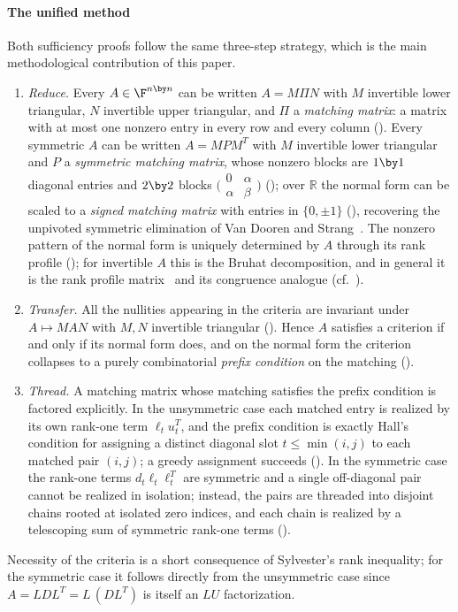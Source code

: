 \paragraph{The unified method}
Both sufficiency proofs follow the same three-step strategy, which is the
main methodological contribution of this paper.
\begin{enumerate}
  \item \emph{Reduce.}  Every $A \in \F^{n \by n}$ can be written
    $A = M \Pi N$ with $M$ invertible lower triangular, $N$ invertible upper
    triangular, and $\Pi$ a \emph{matching matrix}: a matrix with at most one
    nonzero entry in every row and every column
    ().  Every symmetric $A$ can be written
    $A = M P M^T$ with $M$ invertible lower triangular and $P$ a
    \emph{symmetric matching matrix}, whose nonzero blocks are $1 \by 1$
    diagonal entries and $2 \by 2$ blocks
    $\bigl(\begin{smallmatrix} 0 & \alpha\\ \alpha & \beta
    \end{smallmatrix}\bigr)$ (); over $\mathbb{R}$
    the normal form can be scaled to a \emph{signed matching matrix} with
    entries in $\{0, \pm 1\}$ (), recovering the
    unpivoted symmetric elimination of Van Dooren and
    Strang~\cite{vandooren_strang_2014}.  The nonzero pattern of the
    normal form is uniquely determined by $A$ through its rank profile
    (); for invertible $A$ this is the Bruhat
    decomposition, and in general it is the rank profile
    matrix~\cite{dumas_pernet_sultan_2017} and its congruence analogue
    (cf.~\cite{szechtman_2007}).
  \item \emph{Transfer.}  All the nullities appearing in the criteria are
    invariant under $A \mapsto MAN$ with $M, N$ invertible triangular
    ().  Hence $A$ satisfies a criterion if and only if
    its normal form does, and on the normal form the criterion collapses to
    a purely combinatorial \emph{prefix condition} on the matching
    ().
  \item \emph{Thread.}  A matching matrix whose matching satisfies the
    prefix condition is factored explicitly.  In the unsymmetric case each
    matched entry is realized by its own rank-one term
    $\ell_t u_t^T$, and the prefix condition is exactly Hall's condition for
    assigning a distinct diagonal slot $t \le \min(i,j)$ to each matched pair
    $(i,j)$; a greedy assignment succeeds ().  In the
    symmetric case the rank-one terms $d_t \ell_t \ell_t^T$ are symmetric and
    a single off-diagonal pair cannot be realized in isolation; instead, the
    pairs are threaded into disjoint chains rooted at isolated zero indices,
    and each chain is realized by a telescoping sum of symmetric rank-one
    terms ().
\end{enumerate}
Necessity of the criteria is a short consequence of Sylvester's rank
inequality; for the symmetric case it follows directly from the unsymmetric
case since $A = LDL^T = L \, (DL^T)$ is itself an $LU$ factorization.

